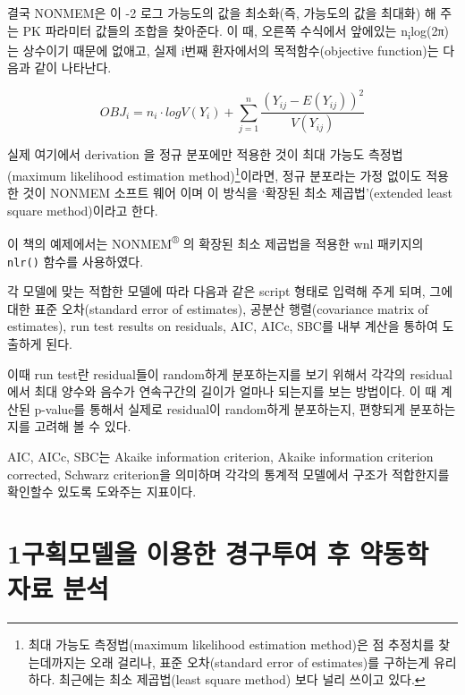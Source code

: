 \documentclass[
  11pt,
  krantz2, a4paper, twoside]{krantz}
\theoremstyle{definition}
\theoremstyle{definition}
\theoremstyle{definition}
\theoremstyle{definition}
\theoremstyle{remark}
\begin{document}
결국 NONMEM은 이 -2 로그 가능도의 값을 최소화(즉, 가능도의 값을 최대화) 해 주는 PK 파라미터 값들의 조합을 찾아준다.
이 때, 오른쪽 수식에서 앞에있는 n\textsubscript{i}log(2π)는 상수이기 때문에 없애고, 실제 i번째 환자에서의 목적함수(objective function)는 다음과 같이 나타난다.

\begin{equation}
OBJ_i = n_i \cdot logV(Y_i) + \sum_{j=1}^{n} \frac{(Y_{ij} - E(Y_{ij}))^2}{V(Y_{ij})}
\label{eq:eq5-4}
\end{equation}

실제 여기에서 derivation 을 정규 분포에만 적용한 것이 최대 가능도 측정법(maximum likelihood estimation method)\footnote{최대 가능도 측정법(maximum likelihood estimation method)은 점 추정치를 찾는데까지는 오래 걸리나, 표준 오차(standard error of estimates)를 구하는게 유리하다. 최근에는 최소 제곱법(least square method) 보다 널리 쓰이고 있다.}이라면, 정규 분포라는 가정 없이도 적용한 것이 NONMEM 소프트 웨어 이며 이 방식을 `확장된 최소 제곱법'(extended least square method)이라고 한다. 

이 책의 예제에서는 NONMEM\textsuperscript{®} 의 확장된 최소 제곱법을 적용한 wnl 패키지의 \texttt{nlr()} 함수를 사용하였다.

각 모델에 맞는 적합한 모델에 따라 다음과 같은 script 형태로 입력해 주게 되며, 그에 대한 표준 오차(standard error of estimates), 공분산 행렬(covariance matrix of estimates), run test results on residuals, AIC, AICc, SBC를 내부 계산을 통하여 도출하게 된다.

이때 run test란 residual들이 random하게 분포하는지를 보기 위해서 각각의
residual에서 최대 양수와 음수가 연속구간의 길이가 얼마나 되는지를 보는
방법이다. 이 때 계산된 p-value를 통해서 실제로 residual이 random하게
분포하는지, 편향되게 분포하는지를 고려해 볼 수 있다.

AIC, AICc, SBC는 Akaike information criterion, Akaike information
criterion corrected, Schwarz criterion을 의미하며 각각의 통계적 모델에서
구조가 적합한지를 확인할수 있도록 도와주는 지표이다.

\hypertarget{uxad6cuxd68duxbaa8uxb378uxc744-uxc774uxc6a9uxd55c-uxacbduxad6cuxd22cuxc5ec-uxd6c4-uxc57duxb3d9uxd559-uxc790uxb8cc-uxbd84uxc11d}{%
\section{\texorpdfstring{1구획모델을 이용한 경구투여 후 약동학 자료 분석}{1구획모델을 이용한 경구투여 후 약동학 자료 분석}}\label{uxad6cuxd68duxbaa8uxb378uxc744-uxc774uxc6a9uxd55c-uxacbduxad6cuxd22cuxc5ec-uxd6c4-uxc57duxb3d9uxd559-uxc790uxb8cc-uxbd84uxc11d}}
\end{document}
